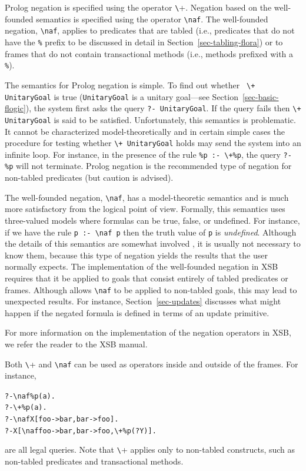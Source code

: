 \documentclass[11pt]{article}
\newcommand{\ERGO}{\mbox{\smaller{\ensuremath{\cal{E}}\smaller{{\sc{RGO}}}}}\xspace}
\newcommand{\FLSYSTEM}{\ERGO}
\newcommand{\bs}{\textbackslash}
\newcommand{\PLGNAF}{\mbox{\texttt{\bs}+}\xspace}
\newcommand{\RULELOGNAF}{{\texttt{{\bs}naf}}\xspace}
\begin{document}
Prolog negation is specified using the operator \PLGNAF.
Negation based on the well-founded semantics is specified using the
operator \RULELOGNAF.  The well-founded negation, \RULELOGNAF, applies to predicates
that are tabled (i.e., predicates that do not have the {\tt \%} prefix
to be discussed in detail in Section~\ref{sec-tabling-flora}) or
to frames that do not contain transactional methods (i.e., methods
prefixed with a {\tt \%}).

The semantics for Prolog negation is simple. To find out whether {\tt
  \PLGNAF UnitaryGoal} is true (\texttt{UnitaryGoal} is a unitary
goal---see Section~\ref{sec-basic-flogic}),
the system first asks the query {\tt ?- UnitaryGoal}. If the query
fails then {\tt \PLGNAF UnitaryGoal} is said to be satisfied. Unfortunately, this
semantics is problematic. It cannot be characterized model-theoretically
and in certain simple cases the procedure for testing whether {\tt \PLGNAF
  UnitaryGoal}
holds may send the system into an infinite loop. For instance, in the
presence of the rule {\tt \%p :- \PLGNAF \%p}, the query {\tt ?- \%p} will not
terminate.  Prolog negation is the recommended type of negation for
non-tabled predicates (but caution is advised).

The well-founded negation, \RULELOGNAF, has a model-theoretic semantics and is
much more
satisfactory from the logical point of view.
Formally, this semantics uses three-valued models where formulas can be
true, false, or undefined. For instance, if we have the rule
{\tt p :- \RULELOGNAF p} then the truth value of {\tt p} is \emph{undefined}.  
Although the details of this
semantics are somewhat involved \cite{gelder-ross-schlipf-91}, it is
usually not necessary to know them, because this type of negation yields
the results that the user normally expects. The implementation of
the well-founded negation in XSB requires that it be applied to goals that
consist entirely of tabled predicates or frames.
Although \FLSYSTEM allows \RULELOGNAF to be applied to non-tabled goals,
this may lead to unexpected results.  For instance, 
Section~\ref{sec-updates} discusses what might happen if the
negated formula is defined in terms of an update primitive.

For more information on the implementation of the negation operators in
XSB, we refer the reader to the XSB manual.

Both \PLGNAF and \RULELOGNAF can be used as operators inside and outside of
the frames. For instance,
\begin{alltt}
       ?- \RULELOGNAF \%p(a).
       ?- \PLGNAF \%p(a).
       ?- \RULELOGNAF X[foo->bar, bar->foo].
       ?- X[\RULELOGNAF foo->bar, bar->foo, \PLGNAF \%p(?Y)].
\end{alltt}
are all legal queries. Note that \PLGNAF applies only to non-tabled
constructs, such as non-tabled \FLSYSTEM predicates and transactional methods.
\end{document}
